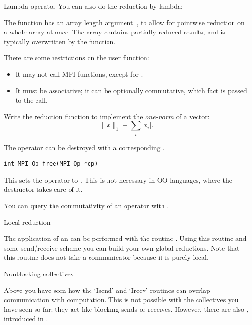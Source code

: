 \begin{mplnote}{Lambda operator}
  You can also do the reduction by lambda:
\end{mplnote}

The function has an array length argument~, to allow for
pointwise reduction on a whole array at once. The  array
contains partially reduced results, and is typically overwritten by
the function.

There are some restrictions on the user function:
\begin{itemize}
\item It may not call MPI functions, except for
  .
\item It must be associative; it can be optionally commutative, which
  fact is passed to the  call.
\end{itemize}

\begin{exercise}
  \label{ex:one-norm-op}
  Write the reduction function to implement the
  \emph{one-norm} of a vector:
  \[ \|x\|_1 \equiv \sum_i |x_i|. \]
\end{exercise}

The operator can be destroyed with a corresponding
.
\begin{lstlisting}
int MPI_Op_free(MPI_Op *op)
\end{lstlisting}
This sets the operator to .
This is not necessary in \ac{OO} languages,
where the destructor takes care of it.

You can query the commutativity of an operator with
%
.

 {Local reduction}

The application of an  can be performed with the routine
. Using this routine and some
send/receive scheme you can build your own global reductions. Note
that this routine does not take a communicator because it is purely local.


 {Nonblocking collectives}
\label{sec:mpi3collect}

Above you have seen how the `Isend' and `Irecv' routines can overlap communication
with computation. This is not possible with the collectives you have seen so far:
they act like blocking sends or receives.
However, there are also ,
introduced in .

